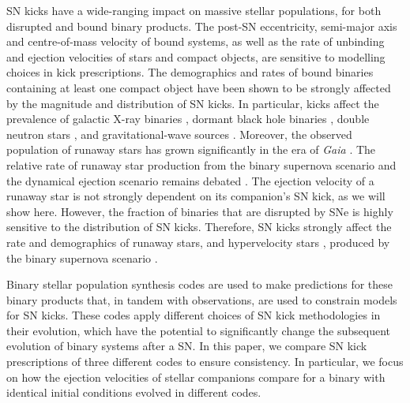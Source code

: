 \documentclass[apj,twocolumn]{openjournal}
\begin{document}
SN kicks have a wide-ranging impact on massive stellar populations, for both disrupted and bound binary products. The post-SN eccentricity, semi-major axis and centre-of-mass velocity of bound systems, as well as the rate of unbinding and ejection velocities of stars and compact objects, are sensitive to modelling choices in kick prescriptions. The demographics and rates of bound binaries containing at least one compact object have been shown to be strongly affected by the magnitude and distribution of SN kicks. In particular, kicks affect the prevalence of galactic X-ray binaries \citep[e.g.,][]{Tauris+1999:1999MNRAS.310.1165T, Pfahl+2002:2002ApJ...574..364P, Wong+2012:2012ApJ...747..111W,Vigna-Gomez+2024:2024PhRvL.132s1403V}, dormant black hole binaries \citep[e.g.,][]{Breivik+2017:2017ApJ...850L..13B}, double neutron stars \citep[e.g.,][]{Brandt+1995:1995MNRAS.274..461B,Wex+2000:2000ApJ...528..401W,Podsiadlowski+2004:2004ApJ...612.1044P,Bray+2016:2016MNRAS.461.3747B, Vigna-Gomez+2018:2018MNRAS.481.4009V}, and gravitational-wave sources \citep[e.g.,][]{Fryer+1998:1998ApJ...496..333F,Belczynski+1999:1999A&A...346...91B,Dominik+2013:2013ApJ...779...72D,Broekgaarden+2022, Wagg+2022}. Moreover, the observed population of runaway stars has grown significantly in the era of \textit{Gaia} \citep[e.g.,][]{Carretero-Castrillo+2023:2023A&A...679A.109C}. The relative rate of runaway star production from the binary supernova scenario \citep{Blaauw+1961, Boersma+1961} and the dynamical ejection scenario \citep{Poveda+1967} remains debated \citep[e.g.,][]{DorigoJones+2020:2020ApJ...903...43D, Sana+2022}. The ejection velocity of a runaway star is not strongly dependent on its companion's SN kick, as we will show here. However, the fraction of binaries that are disrupted by SNe is highly sensitive to the distribution of SN kicks. Therefore, SN kicks strongly affect the rate and demographics of runaway stars, and hypervelocity stars \citep[e.g.,][]{Tauris+2015:2015MNRAS.448L...6T}, produced by the binary supernova scenario \citep[e.g.,][]{DeDonder+1997:1997A&A...318..812D,Eldridge+2011:2011MNRAS.414.3501E,Renzo+2019:2019A&A...624A..66R,Wagg+2025:2025arXiv250417903W}.

Binary stellar population synthesis codes are used to make predictions for these binary products that, in tandem with observations, are used to constrain models for SN kicks. These codes apply different choices of SN kick methodologies in their evolution, which have the potential to significantly change the subsequent evolution of binary systems after a SN. In this paper, we compare SN kick prescriptions of three different codes to ensure consistency. In particular, we focus on how the ejection velocities of stellar companions compare for a binary with identical initial conditions evolved in different codes.
\end{document}
